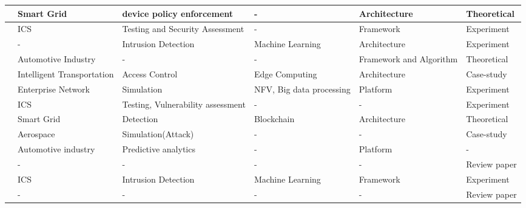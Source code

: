 \begin{table}[H]
\begin{NiceTabular}{p{0.5cm}|p{2cm}|p{2.5cm}|p{2cm}|p{3cm}|p{1.5cm}}
    \cite{giovannipaolosellittoEnablingZeroTrust2021} & Smart Grid & device policy enforcement & - & Architecture & Theoretical \\
    \hline

    \cite{dietzEmployingDigitalTwins2022} & ICS & Testing and Security Assessment & - & Framework & Experiment \\
    \hline

    \cite{sousaELEGANTSecurityCritical2021} & - & Intrusion Detection & Machine Learning & Architecture & Experiment \\
    \hline

    \cite{xuEfficientAuthenticationVehicular2021} & Automotive Industry & - & - & Framework and Algorithm & Theoretical \\
    \hline

   \cite{glenandbensonjamesandguptamaanakandsandhuravicatheyEdgeCentricSecure2021} & Intelligent Transportation & Access Control & Edge Computing & Architecture & Case-study \\
   \hline

   \cite{wangDTCPNDigitalTwin2022} & Enterprise Network & Simulation & NFV, Big data processing & Platform & Experiment \\
   \hline

   \cite{franciaDigitalTwinsIndustrial2021} & ICS & Testing, Vulnerability assessment & - & - & Experiment \\
   \hline

   \cite{lopezDIGITALTWINSINTELLIGENT2021} & Smart Grid & Detection & Blockchain & Architecture & Theoretical \\
    \hline
    
   \cite{adrienbacueDigitalTwinsEnhanced2022} & Aerospace & Simulation(Attack) & - & - & Case-study \\
    \hline
    
   \cite{veledarDigitalTwinsDependability2019} & Automotive industry & Predictive analytics & - & Platform & - \\
   \hline

   \cite{holmesDigitalTwinsCyber2021} & - & - & - & - & Review paper \\
   \hline

   \cite{vargheseDigitalTwinbasedIntrusion2022} & ICS & Intrusion Detection & Machine Learning & Framework & Experiment \\
   \hline

   \cite{rajivfaleiroDigitalTwinCybersecurity2022} & - & - & - & - & Review paper \\
   \hline


\end{NiceTabular}
\end{table}
